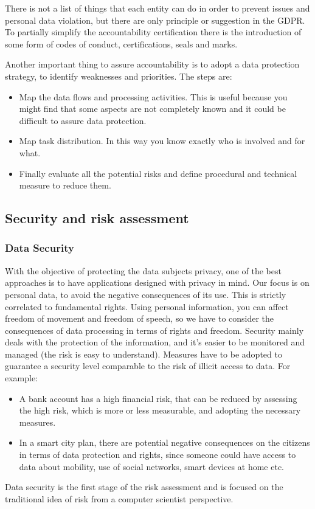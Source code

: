 There is not a list of things that each entity can do in order to prevent issues and personal data violation, but there are only principle or suggestion in the GDPR. To partially simplify the accountability certification there is the introduction of some form of codes of conduct, certifications, seals and marks. 

Another important thing to assure accountability is to adopt a data protection strategy, to identify weaknesses and priorities.
The steps are:
\begin{itemize}
    \item Map the data flows and processing activities. This is useful because you might find that some aspects are not completely known and it could be difficult to assure data protection.
    \item Map task distribution. In this way you know exactly who is involved and for what. 
    \item Finally evaluate all the potential risks and define procedural and technical measure to reduce them.
\end{itemize}
\subsection{Security and risk assessment}
\subsubsection{Data Security}
With the objective of protecting the data subjects privacy, one of the best approaches is to have applications designed with privacy in mind.
Our focus is on personal data, to avoid the negative consequences of its use. This is strictly correlated to fundamental rights.
Using personal information, you can affect freedom of movement and freedom of speech, so we have to consider the consequences of data processing in terms of rights and freedom.
Security mainly deals with the protection of the information, and it's easier to be monitored and managed (the risk is easy to understand). Measures have to be adopted to guarantee a security level comparable to the risk of illicit access to data. For example:
\begin{itemize}
    \item A bank account has a high financial risk, that can be reduced by assessing the high risk, which is more or less measurable, and adopting the necessary measures. 
    \item In a smart city plan, there are potential negative consequences on the citizens in terms of data protection and rights, since someone could have access to data about mobility, use of social networks, smart devices at home etc.
\end{itemize}
Data security is the first stage of the risk assessment and is focused on the traditional idea of risk from a computer scientist perspective.
